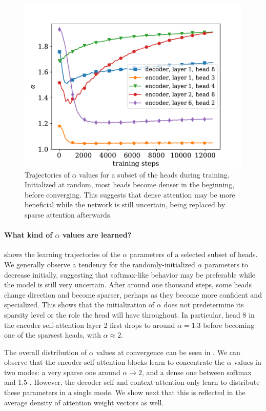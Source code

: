 \begin{figure}[ht]
    \centering
    \includegraphics[width=0.85\columnwidth]{Figures/learning_alpha.pdf}
    \caption{\label{fig:learning_alpha}
        Trajectories of $\alpha$ values for a subset of the heads during
        training. Initialized at random, most heads become denser in the
        beginning, before converging. This suggests that dense attention may
        be more beneficial while the network is still uncertain, being
        replaced by sparse attention afterwards.}
\end{figure}

\paragraph*{What kind of {\boldmath $\alpha$} values are learned?}
 shows the learning trajectories of the
$\alpha$ parameters of a selected subset of heads. We generally
observe a tendency for the randomly-initialized $\alpha$ parameters
to decrease initially, suggesting that softmax-like behavior may be
preferable while the model is still very uncertain. After around one
thousand steps, some heads change direction and become sparser,
perhaps as they become more confident and specialized. This shows
that the initialization of $\alpha$ does not predetermine its
sparsity level or the role the head will have throughout. In
particular, head $8$ in the encoder self-attention layer $2$ first
drops to around $\alpha=1.3$ before becoming one of the sparsest
heads, with $\alpha\approx2$.

The overall distribution of $\alpha$ values at convergence can be
seen in . We can observe that the encoder
self-attention blocks learn to concentrate the $\alpha$ values in two
modes: a very sparse one around $\alpha \rightarrow 2$, and a dense
one between softmax and 1.5-\entmaxtext{}. However, the decoder self
and context attention only learn to distribute these parameters in a
single mode. We show next that this is reflected in the average
density of attention weight vectors as well.


